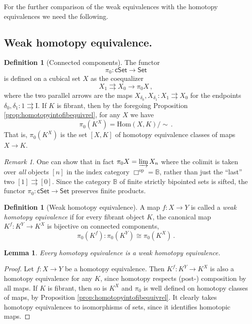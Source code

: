 \documentclass[11pt,reqno]{amsart}
\newcommand{\B}{\ensuremath{\mathbb{B}}}
\newcommand{\Set}{\ensuremath{\mathsf{Set}}}
\newcommand{\cSet}{\ensuremath{\mathsf{cSet}}}
\newcommand{\op}[1]{\ensuremath{{#1}^{\mathrm{op}}}}
\newcommand{\ra}{\ensuremath{\rightarrow}}
\renewcommand{\hom}{\ensuremath{\mathrm{Hom}}}
\newcommand{\I}{\ensuremath{\mathrm{I}}}
\newtheorem{lemma}[theorem]{Lemma}
\theoremstyle{remark}
\newtheorem{remark}[theorem]{Remark}
\theoremstyle{definition}
\newtheorem{definition}[theorem]{Definition}
\begin{document}
For the further comparison of the weak equivalences with the homotopy equivalences we need the following.

\subsection*{Weak homotopy equivalence.}

\begin{definition}[Connected components]
The functor 
\[
\pi_0 : \cSet\ra\Set
\]
 is defined on a cubical set $X$ as the coequalizer 
 \[
 X_1\rightrightarrows X_0\ra \pi_0X\,,
 \]
  where the two parallel arrows are the maps $X_{\delta_0}, X_{\delta_1} : X_1 \rightrightarrows X_0$ for the endpoints $\delta_0, \delta_1 : 1 \rightrightarrows \I$.   If $K$ is fibrant, then by the foregoing Proposition \ref{prop:homotopyintofibequivrel}, for any $X$ we have  
  \[
  \pi_0(K^X) = \hom(X,K)/\!\!\sim\,.
  \]
    That is, $\pi_0(K^X)$ is the set  $[X, K]$ of homotopy equivalence classes of maps $X\ra K$.
\end{definition}

\begin{remark}
One can show that in fact $\pi_0X = \varinjlim X_n$ where the colimit is taken over \emph{all} objects $[n]$ in the index category $\op\Box = \B$, rather than just the ``last'' two $[1]\rightrightarrows [0]$. Since the category $\B$ of finite strictly bipointed sets is sifted, 
the functor $\pi_0: \cSet\ra\Set$ preserves finite products. 
\end{remark}

\begin{definition}[Weak homotopy equivalence]\label{def:WHE}
A map $f: X\ra Y$ is called a \emph{weak homotopy equivalence} if for every fibrant object $K$, the canonical map $K^f : K^Y \ra K^X$ is bijective on connected components,  
\[
\pi_0(K^f) : \pi_0(K^Y) \cong \pi_0(K^X)\,.
\]
\end{definition}

\begin{lemma}\label{lemma:HEisWHE}
Every homotopy equivalence is a weak homotopy equivalence.
\end{lemma}
%
\begin{proof}
Let $f: X\ra Y$ be a homotopy equivalence.  Then $K^f : K^Y \ra K^X$ is also a homotopy equivalence for any $K$, since homotopy respects (post-) composition by all maps.  If $K$ is fibrant, then so is $K^X$ and $\pi_0$ is well defined on homotopy classes of maps, by Proposition \ref{prop:homotopyintofibequivrel}.  It clearly takes homotopy equivalences to isomorphisms of sets, since it identifies homotopic maps.
\end{proof}
\end{document}
